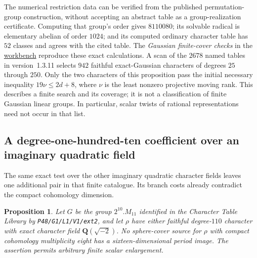 \documentclass[11pt]{article}
\newtheorem{proposition}[theorem]{Proposition}
\theoremstyle{definition}
\theoremstyle{remark}
\newcommand{\Q}{\mathbf Q}
\newcommand{\workbenchurl}{https://github.com/KokunoYumeto/algebraic-cycles-and-motives-workbench}
\begin{document}
The numerical restriction data can be verified from the published
permutation-group construction, without accepting an abstract table
as a group-realization certificate. Computing that group's order gives
$8110080$; its solvable radical is elementary abelian of order $1024$;
and its computed ordinary character table has $52$ classes and agrees
with the cited table. The \emph{Gaussian finite-cover checks} in the
\href{\workbenchurl}{workbench} reproduce these exact calculations.
A scan of the $2678$ named tables in version~1.3.11 selects $942$
faithful exact-Gaussian characters of degrees $25$ through $250$.
Only the two characters of this proposition pass the initial necessary
inequality $19\nu\le2d+8$, where $\nu$ is the least nonzero projective
moving rank. This describes a finite search and its coverage; it is
not a classification of finite Gaussian linear groups. In particular,
scalar twists of rational representations need not occur in that list.

\subsection{A degree-one-hundred-ten coefficient over an imaginary quadratic field}

The same exact test over the other imaginary quadratic character
fields leaves one additional pair in that finite catalogue.  Its
branch costs already contradict the compact cohomology dimension.

\begin{proposition}\label{prop:degree110-cover}
Let $G$ be the group $2^{10}.M_{11}$ identified in the Character Table
Library by \texttt{P48/G1/L1/V1/ext2}, and let $\rho$ have either
faithful degree-$110$ character with exact character field
$\Q(\sqrt{-2})$.  No sphere-cover source for $\rho$ with compact
cohomology multiplicity eight has a sixteen-dimensional period image.
The assertion permits arbitrary finite scalar enlargement.
\end{proposition}
\end{document}
